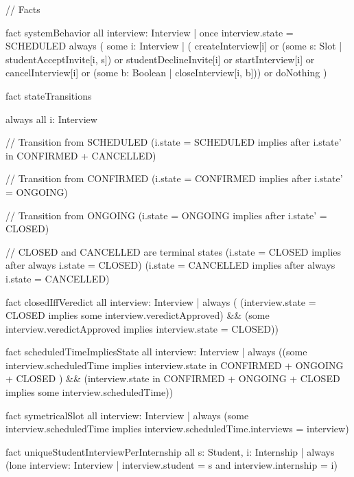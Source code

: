 // Facts

fact systemBehavior {
	all interview: Interview | once interview.state = SCHEDULED
	always (
		some i: Interview | (
			createInterview[i] or
			(some s: Slot | studentAcceptInvite[i, s]) or
			studentDeclineInvite[i] or
			startInterview[i] or
			cancelInterview[i] or
			(some b: Boolean | closeInterview[i, b])) or
			doNothing
	)
}

fact stateTransitions {
    always all i: Interview {
        // Transition from SCHEDULED
        (i.state = SCHEDULED implies after i.state' in CONFIRMED + CANCELLED) 
        
        // Transition from CONFIRMED
        (i.state = CONFIRMED implies after i.state' = ONGOING)
        
        // Transition from ONGOING
        (i.state = ONGOING implies after i.state' = CLOSED)
        
        // CLOSED and CANCELLED are terminal states
        (i.state = CLOSED implies after always i.state = CLOSED)
        (i.state = CANCELLED implies after always i.state = CANCELLED)
    }
}



fact closedIffVeredict {
    all interview: Interview |
	always (
		(interview.state = CLOSED implies some interview.veredictApproved) &&
		(some interview.veredictApproved implies interview.state = CLOSED))
}

fact scheduledTimeImpliesState {
   all interview: Interview |
	always ((some interview.scheduledTime implies interview.state in 
			CONFIRMED +
			ONGOING +
			CLOSED
		) &&
		(interview.state in CONFIRMED + ONGOING + CLOSED implies
                some interview.scheduledTime))
}

fact symetricalSlot {
   all interview: Interview |
	always (some interview.scheduledTime implies
            interview.scheduledTime.interviews = {interview})
}

fact uniqueStudentInterviewPerInternship {
    all s: Student, i: Internship |
        always (lone interview: Interview | 
            interview.student = s and interview.internship = i)
}
